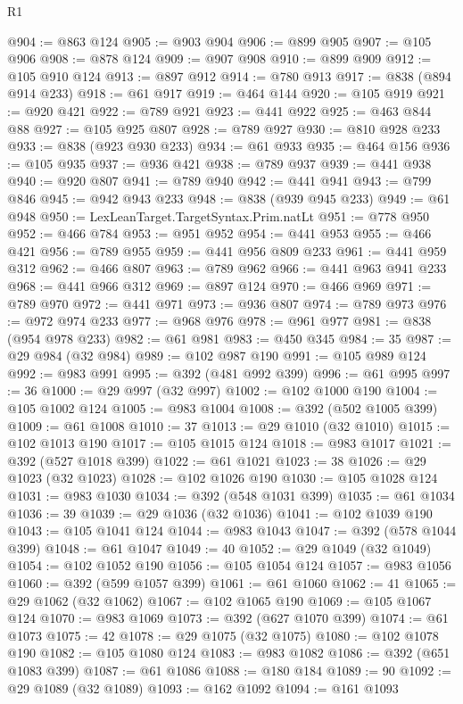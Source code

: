 \begin{lexlean}{R1}
\begin{coremodule}
@904 := @863 @124
@905 := @903 @904
@906 := @899 @905
@907 := @105 @906
@908 := @878 @124
@909 := @907 @908
@910 := @899 @909
@912 := @105 @910 @124
@913 := @897 @912
@914 := @780 @913
@917 := @838 (@894 @914 @233)
@918 := @61 @917
@919 := @464 @144
@920 := @105 @919
@921 := @920 @421
@922 := @789 @921
@923 := @441 @922
@925 := @463 @844 @88
@927 := @105 @925 @807
@928 := @789 @927
@930 := @810 @928 @233
@933 := @838 (@923 @930 @233)
@934 := @61 @933
@935 := @464 @156
@936 := @105 @935
@937 := @936 @421
@938 := @789 @937
@939 := @441 @938
@940 := @920 @807
@941 := @789 @940
@942 := @441 @941
@943 := @799 @846
@945 := @942 @943 @233
@948 := @838 (@939 @945 @233)
@949 := @61 @948
@950 := LexLeanTarget.TargetSyntax.Prim.natLt
@951 := @778 @950
@952 := @466 @784
@953 := @951 @952
@954 := @441 @953
@955 := @466 @421
@956 := @789 @955
@959 := @441 @956 @809 @233
@961 := @441 @959 @312
@962 := @466 @807
@963 := @789 @962
@966 := @441 @963 @941 @233
@968 := @441 @966 @312
@969 := @897 @124
@970 := @466 @969
@971 := @789 @970
@972 := @441 @971
@973 := @936 @807
@974 := @789 @973
@976 := @972 @974 @233
@977 := @968 @976
@978 := @961 @977
@981 := @838 (@954 @978 @233)
@982 := @61 @981
@983 := @450 @345
@984 := 35
@987 := @29 @984 (@32 @984)
@989 := @102 @987 @190
@991 := @105 @989 @124
@992 := @983 @991
@995 := @392 (@481 @992 @399)
@996 := @61 @995
@997 := 36
@1000 := @29 @997 (@32 @997)
@1002 := @102 @1000 @190
@1004 := @105 @1002 @124
@1005 := @983 @1004
@1008 := @392 (@502 @1005 @399)
@1009 := @61 @1008
@1010 := 37
@1013 := @29 @1010 (@32 @1010)
@1015 := @102 @1013 @190
@1017 := @105 @1015 @124
@1018 := @983 @1017
@1021 := @392 (@527 @1018 @399)
@1022 := @61 @1021
@1023 := 38
@1026 := @29 @1023 (@32 @1023)
@1028 := @102 @1026 @190
@1030 := @105 @1028 @124
@1031 := @983 @1030
@1034 := @392 (@548 @1031 @399)
@1035 := @61 @1034
@1036 := 39
@1039 := @29 @1036 (@32 @1036)
@1041 := @102 @1039 @190
@1043 := @105 @1041 @124
@1044 := @983 @1043
@1047 := @392 (@578 @1044 @399)
@1048 := @61 @1047
@1049 := 40
@1052 := @29 @1049 (@32 @1049)
@1054 := @102 @1052 @190
@1056 := @105 @1054 @124
@1057 := @983 @1056
@1060 := @392 (@599 @1057 @399)
@1061 := @61 @1060
@1062 := 41
@1065 := @29 @1062 (@32 @1062)
@1067 := @102 @1065 @190
@1069 := @105 @1067 @124
@1070 := @983 @1069
@1073 := @392 (@627 @1070 @399)
@1074 := @61 @1073
@1075 := 42
@1078 := @29 @1075 (@32 @1075)
@1080 := @102 @1078 @190
@1082 := @105 @1080 @124
@1083 := @983 @1082
@1086 := @392 (@651 @1083 @399)
@1087 := @61 @1086
@1088 := @180 @184
@1089 := 90
@1092 := @29 @1089 (@32 @1089)
@1093 := @162 @1092
@1094 := @161 @1093

\end{coremodule}
\end{lexlean}
